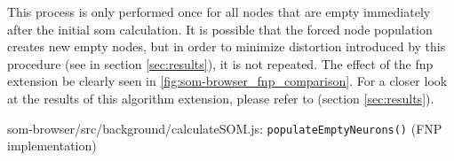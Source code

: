 This process is only performed once for all nodes that are empty immediately
after the initial \gls{som} calculation. It is possible that the forced node
population creates new empty nodes, but in order to minimize distortion
introduced by this procedure
(see  in section \ref{sec:results}),
it is not repeated. The effect of the \gls{fnp} extension be clearly seen in
\ref{fig:som-browser_fnp_comparison}. For a closer look at the results of this
algorithm extension, please refer to
 (section \ref{sec:results}).

\begin{listing}[!htb]
  \caption[FNP implementation]{som-browser/src/background/calculateSOM.js:
  \texttt{populateEmptyNeurons()} (FNP implementation)}
  \label{lst:som-browser_fnp}
\end{listing}
